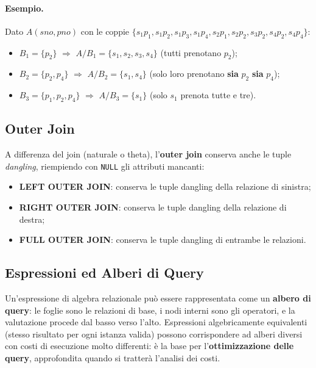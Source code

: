 \documentclass[12pt, a4paper]{article}
\begin{document}
\paragraph{Esempio.} Dato $A(sno,pno)$ con le coppie $\{s_1p_1, s_1p_2, s_1p_3, s_1p_4, s_2p_1, s_2p_2, s_3p_2, s_4p_2, s_4p_4\}$:
\begin{itemize}
    \item $B_1 = \{p_2\}$ $\Rightarrow$ $A/B_1 = \{s_1, s_2, s_3, s_4\}$ (tutti prenotano $p_2$);
    \item $B_2 = \{p_2, p_4\}$ $\Rightarrow$ $A/B_2 = \{s_1, s_4\}$ (solo loro prenotano \textbf{sia} $p_2$ \textbf{sia} $p_4$);
    \item $B_3 = \{p_1, p_2, p_4\}$ $\Rightarrow$ $A/B_3 = \{s_1\}$ (solo $s_1$ prenota tutte e tre).
\end{itemize}

\subsection{Outer Join}

A differenza del join (naturale o theta), l'\textbf{outer join} conserva anche le tuple \textit{dangling}, riempiendo con \texttt{NULL} gli attributi mancanti:
\begin{itemize}
    \item \textbf{LEFT OUTER JOIN}: conserva le tuple dangling della relazione di sinistra;
    \item \textbf{RIGHT OUTER JOIN}: conserva le tuple dangling della relazione di destra;
    \item \textbf{FULL OUTER JOIN}: conserva le tuple dangling di entrambe le relazioni.
\end{itemize}

\subsection{Espressioni ed Alberi di Query}

Un'espressione di algebra relazionale può essere rappresentata come un \textbf{albero di query}: le foglie sono le relazioni di base, i nodi interni sono gli operatori, e la valutazione procede dal basso verso l'alto. Espressioni algebricamente equivalenti (stesso risultato per ogni istanza valida) possono corrispondere ad alberi diversi con costi di esecuzione molto differenti: è la base per l'\textbf{ottimizzazione delle query}, approfondita quando si tratterà l'analisi dei costi.
\end{document}
